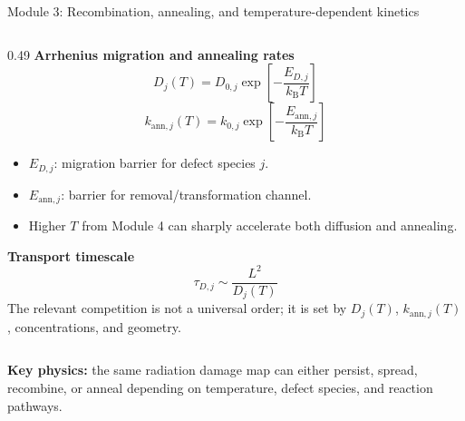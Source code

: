 \documentclass[aspectratio=169,8pt]{beamer}
\newcommand{\kB}{k_{\mathrm B}}
\begin{document}
\begin{frame}{Module 3: Recombination, annealing, and temperature-dependent kinetics}
\begin{columns}[T,totalwidth=\textwidth]
\begin{column}{0.49\textwidth}
\textbf{Arrhenius migration and annealing rates}
\begin{equation*}
\boxed{D_j(T)=D_{0,j}\exp\!\left[-\frac{E_{D,j}}{\kB T}\right]}
\end{equation*}
\begin{equation*}
\boxed{k_{\mathrm{ann},j}(T)=k_{0,j}\exp\!\left[-\frac{E_{\mathrm{ann},j}}{\kB T}\right]}
\end{equation*}
\scriptsize
\begin{itemize}\setlength\itemsep{0.2mm}
\item $E_{D,j}$: migration barrier for defect species $j$.
\item $E_{\mathrm{ann},j}$: barrier for removal/transformation channel.
\item Higher $T$ from Module 4 can sharply accelerate both diffusion and annealing.
\end{itemize}

\vspace{1mm}
\textbf{Transport timescale}
\begin{equation*}
\boxed{\tau_{D,j}\sim \frac{L^2}{D_j(T)}}
\end{equation*}
\small
The relevant competition is not a universal order; it is set by $D_j(T)$, $k_{\mathrm{ann},j}(T)$, concentrations, and geometry.
\end{column}
\end{columns}

\vspace{0.5mm}
\begin{purplebox}
\centering\scriptsize
\textbf{Key physics:} the same radiation damage map can either persist, spread, recombine, or anneal depending on temperature, defect species, and reaction pathways.
\end{purplebox}
\end{frame}
\end{document}
